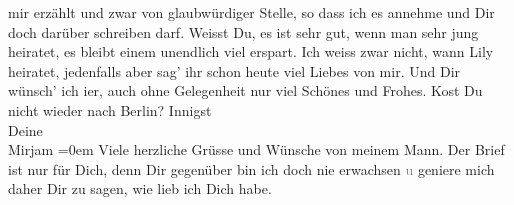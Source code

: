 \begin{ledgroupsized}[t]{13cm}
               mir erzählt und zwar von glaubwürdiger Stelle, so dass ich es annehme und Dir doch
               darüber schreiben darf. Weisst Du, es ist sehr gut, wenn man sehr jung heiratet, es
               bleibt einem unendlich viel erspart. Ich weiss zwar nicht, wann Lily heiratet, jedenfalls {\pb}aber sag’ ihr schon heute viel
               Liebes von mir. Und Dir wünsch’ ich i{\geminationm}er, auch ohne
               Gelegenheit nur viel Schönes und Frohes.\pend
           \pstart
           Ko{\geminationm}st Du nicht wieder nach Berlin?\pend
           \pstart
           Innigst{\\[\baselineskip]}Deine{\\[\baselineskip]}\spacefill\mbox{Mirjam}\pend
           \leftskip=0em{}\pstart
           \noindent{}Viele herzliche Grüsse und Wünsche von meinem Mann.\pend
           \pstart
           Der Brief ist nur für Dich, denn Dir gegenüber bin ich doch nie erwachsen
                     \textcolor{gray}{u} geniere mich daher Dir zu sagen, wie lieb ich Dich
                  habe.\pend
           
         
         \endnumbering{}\end{ledgroupsized}  \newcommand{\dateiname}{L02488}\newcommand{\titel}{Mirjam Beer-Hofmann an Arthur Schnitzler, 8. 6. 1927}\newcommand{\editorInnen}{Martin Anton Müller und Gerd-Hermann Susen}
      
